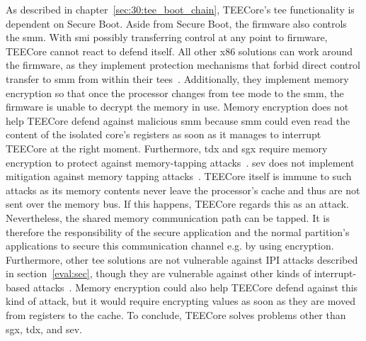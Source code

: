 As described in chapter~\ref{sec:30:tee_boot_chain}, TEECore's \gls{tee}
functionality is dependent on Secure Boot. Aside from Secure Boot, the firmware
also controls the \gls{smm}. With \gls{smi} possibly transferring control at any
point to firmware, TEECore cannot react to defend itself. All other x86
solutions can work around the firmware, as they implement protection mechanisms
that forbid direct control transfer to \gls{smm} from within their
\glspl{tee}~\cite{misono2024confidential, costan2016intel}. Additionally, they
implement memory encryption so that once the processor changes from \gls{tee}
mode to the \gls{smm}, the firmware is unable to decrypt the memory in use.
Memory encryption does not help TEECore defend against malicious \gls{smm}
because \gls{smm} could even read the content of the isolated core's registers
as soon as it manages to interrupt TEECore at the right moment. Furthermore,
\gls{tdx} and \gls{sgx} require memory encryption to protect against
memory-tapping attacks~\cite{tdx_whitepaper, costan2016intel}. \gls{sev} does
not implement mitigation against memory tapping attacks~\cite{kaplan_amd_2020}.
TEECore itself is immune to such attacks as its memory contents never leave the
processor's cache and thus are not sent over the memory bus. If this happens,
TEECore regards this as an attack. Nevertheless, the shared memory communication
path can be tapped. It is therefore the responsibility of the secure application
and the normal partition's applications to secure this communication channel
e.g. by using encryption. Furthermore, other \gls{tee} solutions are not
vulnerable against IPI attacks described in section~\ref{eval:sec}, though they
are vulnerable against other kinds of interrupt-based attacks~\cite{van2017sgx,
schluter2024heckler}. Memory encryption could also help TEECore defend against
this kind of attack, but it would require encrypting values as soon as they are
moved from registers to the cache. To conclude, TEECore solves problems other
than \gls{sgx}, \gls{tdx}, and \gls{sev}. \\

